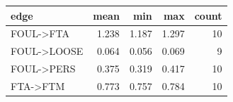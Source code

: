 \begin{tabular}{lrrrr}
\toprule
edge & mean & min & max & count \\
\midrule
FOUL->FTA & 1.238 & 1.187 & 1.297 & 10 \\
FOUL->LOOSE & 0.064 & 0.056 & 0.069 & 9 \\
FOUL->PERS & 0.375 & 0.319 & 0.417 & 10 \\
FTA->FTM & 0.773 & 0.757 & 0.784 & 10 \\
\bottomrule
\end{tabular}
